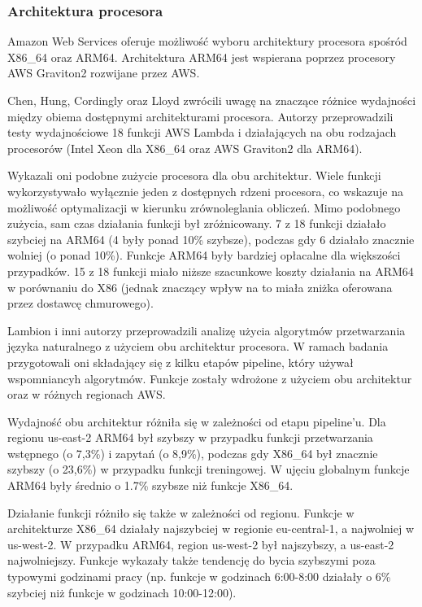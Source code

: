 \subsubsection*{Architektura procesora}

Amazon Web Services oferuje możliwość wyboru architektury procesora spośród X86\_64 oraz ARM64. Architektura ARM64 jest wspierana poprzez procesory AWS Graviton2 rozwijane przez AWS.

Chen, Hung, Cordingly oraz Lloyd \cite{10.1145/3631295.3631394} zwrócili uwagę na znaczące różnice wydajności między obiema dostępnymi architekturami procesora. Autorzy przeprowadzili testy wydajnościowe 18 funkcji AWS Lambda i działających na obu rodzajach procesorów (Intel Xeon dla X86\_64 oraz AWS Graviton2 dla ARM64). 

Wykazali oni podobne zużycie procesora dla obu architektur. Wiele funkcji wykorzystywało wyłącznie jeden z dostępnych rdzeni procesora, co wskazuje na możliwość optymalizacji w kierunku zrównoleglania obliczeń. 
Mimo podobnego zużycia, sam czas działania funkcji był zróżnicowany. 
7 z 18 funkcji działało szybciej na ARM64 (4 były ponad 10\% szybsze), podczas gdy 6 działało znacznie wolniej (o ponad 10\%). 
Funkcje ARM64 były bardziej opłacalne dla większości przypadków. 15 z 18 funkcji miało niższe szacunkowe koszty działania na ARM64 w porównaniu do X86 (jednak znaczący wpływ na to miała zniżka oferowana przez dostawcę chmurowego).

Lambion i inni autorzy \cite{10.1145/3491204.3543506} przeprowadzili analizę użycia algorytmów przetwarzania języka naturalnego z użyciem obu architektur procesora. W ramach badania przygotowali oni składający się z kilku etapów pipeline, który używał wspomniancyh algorytmów. Funkcje zostały wdrożone z użyciem obu architektur oraz w różnych regionach AWS.

Wydajność obu architektur różniła się w zależności od etapu pipeline’u. Dla regionu us-east-2 ARM64 był szybszy w przypadku funkcji przetwarzania wstępnego (o 7,3\%) i zapytań (o 8,9\%), podczas gdy X86\_64 był znacznie szybszy (o 23,6\%) w przypadku funkcji treningowej. W ujęciu globalnym funkcje ARM64 były średnio o 1.7\% szybsze niż funkcje X86\_64.

Działanie funkcji różniło się także w zależności od regionu. Funkcje w architekturze X86\_64 działały najszybciej w regionie eu-central-1, a najwolniej w us-west-2. W przypadku ARM64, region us-west-2 był najszybszy, a us-east-2 najwolniejszy. Funkcje wykazały także tendencję do bycia szybszymi poza typowymi godzinami pracy (np. funkcje w godzinach 6:00-8:00 działały o 6\% szybciej niż funkcje w godzinach 10:00-12:00).

